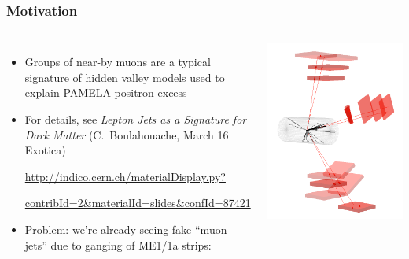 \documentclass[compress]{beamer}
\begin{document}
\begin{frame}
\frametitle{Motivation}

\begin{columns}
\begin{itemize}
\item Groups of near-by muons are a typical signature of hidden valley
  models used to explain PAMELA positron excess

\item For details, see {\it Lepton Jets as a Signature for Dark Matter} {\scriptsize (C.\ Boulahouache, March 16 Exotica)}

\href{http://indico.cern.ch/materialDisplay.py?contribId=2&materialId=slides&confId=87421}{\scriptsize http://indico.cern.ch/materialDisplay.py?}

\vspace{-0.2 cm}
\href{http://indico.cern.ch/materialDisplay.py?contribId=2&materialId=slides&confId=87421}{\scriptsize contribId=2\&materialId=slides\&confId=87421}

\item Problem: we're already seeing fake ``muon jets'' due to ganging of ME1/1a strips:

\end{itemize}

\includegraphics[width=\linewidth]{eventdisplay_3d.png}


\end{columns}
\end{frame}
\end{document}
